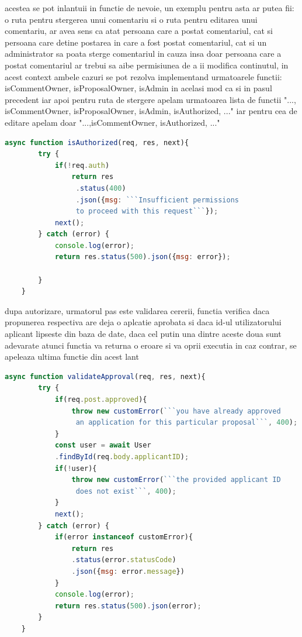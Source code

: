 \documentclass[12pt,a4paper,hidelinks]{report}
\theoremstyle{definition}
\theoremstyle{remark}
\begin{document}
    acestea se pot inlantuii in functie de nevoie, un exemplu pentru asta ar putea fii: o ruta pentru stergerea unui comentariu
    si o ruta pentru editarea unui comentariu, ar avea sens ca atat persoana care a postat comentariul, 
    cat si persoana care detine postarea in care a fost postat comentariul, cat si un administrator sa poata sterge comentariul in cauza 
    insa doar persoana care a postat comentariul ar trebui sa aibe permisiunea de a ii modifica continutul, in acest context
    ambele cazuri se pot rezolva implementand urmatoarele functii: isCommentOwner, isProposalOwner, isAdmin in acelasi mod ca si in pasul precedent
    iar apoi pentru ruta de stergere apelam urmatoarea lista de functii "..., isCommentOwner, isProposalOwner, isAdmin, isAuthorized, ..."
    iar pentru cea de editare apelam doar "...,isCommentOwner, isAuthorized, ..."
    \begin{lstlisting}[language=Javascript]
        async function isAuthorized(req, res, next){
        try {
            if(!req.auth)
                return res
                 .status(400)
                 .json({msg: ```Insufficient permissions
                 to proceed with this request```});
            next();
        } catch (error) {
            console.log(error);
            return res.status(500).json({msg: error});
            
        }
    }
    \end{lstlisting}
    dupa autorizare, urmatorul pas este validarea cererii, functia verifica daca propunerea respectiva are deja o aplcatie aprobata
    si daca id-ul utilizatorului aplicant lipseste din baza de date, daca cel putin una dintre aceste doua sunt adevarate atunci functia va returna o eroare si va oprii executia
    in caz contrar, se apeleaza ultima functie din acest lant
    \begin{lstlisting}[language=Javascript]
        async function validateApproval(req, res, next){
        try {
            if(req.post.approved){
                throw new customError(```you have already approved
                 an application for this particular proposal```, 400);
            }
            const user = await User
            .findById(req.body.applicantID);
            if(!user){
                throw new customError(```the provided applicant ID
                 does not exist```, 400);
            }
            next();
        } catch (error) {
            if(error instanceof customError){
                return res
                .status(error.statusCode)
                .json({msg: error.message})
            }
            console.log(error);
            return res.status(500).json(error);   
        }
    }
    \end{lstlisting}
\end{document}
